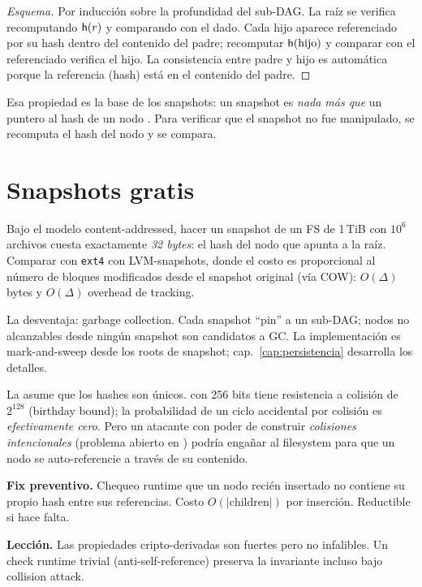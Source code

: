 \begin{proof}[Esquema]
Por inducción sobre la profundidad del sub-DAG. La raíz se verifica
recomputando $\mathsf{h}(r)$ y comparando con el dado. Cada hijo aparece
referenciado por su hash dentro del contenido del padre; recomputar
$\mathsf{h}(\mathrm{hijo})$ y comparar con el referenciado verifica el
hijo. La consistencia entre padre y hijo es automática porque la
referencia (hash) está en el contenido del padre.
\end{proof}

Esa propiedad es la base de los snapshots: un snapshot es \emph{nada
más que} un puntero al hash de un nodo \NVer{}. Para verificar que el
snapshot no fue manipulado, se recomputa el hash del nodo \NVer{} y se
compara.

\section{Snapshots gratis}

Bajo el modelo content-addressed, hacer un snapshot de un FS de 1\,TiB
con \(10^6\) archivos cuesta exactamente \emph{32 bytes}: el hash del
nodo \NVer{} que apunta a la raíz. Comparar con \texttt{ext4} con
LVM-snapshots, donde el costo es proporcional al número de bloques
modificados desde el snapshot original (vía COW): $O(\Delta)$ bytes y
$O(\Delta)$ overhead de tracking.

La desventaja: garbage collection. Cada snapshot ``pin'' a un sub-DAG;
nodos no alcanzables desde ningún snapshot son candidatos a GC. La
implementación es mark-and-sweep desde los roots de snapshot;
cap.~\ref{cap:persistencia} desarrolla los detalles.

\begin{trampa}
\label{tr:blake3-collision}
La  asume que los hashes son únicos.
\blake{} con 256 bits tiene resistencia a colisión de $2^{128}$
(birthday bound); la probabilidad de un ciclo accidental por colisión
es \emph{efectivamente cero}. Pero un atacante con poder de construir
\emph{colisiones intencionales} (problema abierto en \blake{}) podría
engañar al filesystem para que un nodo se auto-referencie a través de
su contenido.

\textbf{Fix preventivo.} Chequeo runtime que un nodo recién insertado
no contiene su propio hash entre sus referencias. Costo $O(|\text{children}|)$
por inserción. Reductible si hace falta.

\textbf{Lección.} Las propiedades cripto-derivadas son fuertes pero no
infalibles. Un check runtime trivial (anti-self-reference) preserva la
invariante incluso bajo collision attack.
\end{trampa}

